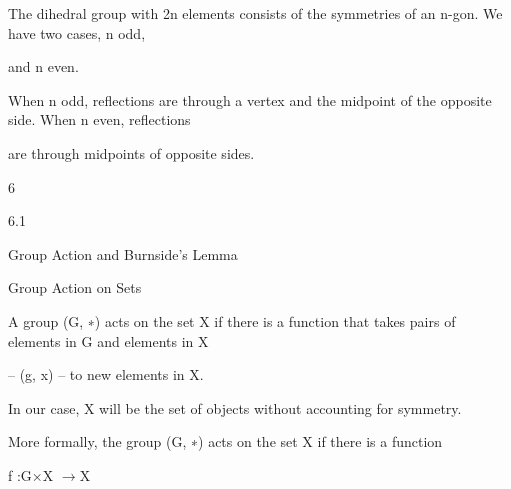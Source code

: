 \documentclass[a4paper,portrait,12pt]{article}
\begin{document}
\begin{flushleft}
The dihedral group with 2n elements consists of the symmetries of an n-gon. We have two cases, n odd,
\end{flushleft}


\begin{flushleft}
and n even.
\end{flushleft}


\begin{flushleft}
When n odd, reflections are through a vertex and the midpoint of the opposite side. When n even, reflections
\end{flushleft}


\begin{flushleft}
are through midpoints of opposite sides.
\end{flushleft}





6


6.1





\begin{flushleft}
Group Action and Burnside's Lemma
\end{flushleft}


\begin{flushleft}
Group Action on Sets
\end{flushleft}





\begin{flushleft}
A group (G, ∗) acts on the set X if there is a function that takes pairs of elements in G and elements in X
\end{flushleft}


\begin{flushleft}
-- (g, x) -- to new elements in X.
\end{flushleft}


\begin{flushleft}
In our case, X will be the set of objects without accounting for symmetry.
\end{flushleft}


\begin{flushleft}
More formally, the group (G, ∗) acts on the set X if there is a function
\end{flushleft}


\begin{flushleft}
f :G×X $\rightarrow$X
\end{flushleft}
\end{document}
